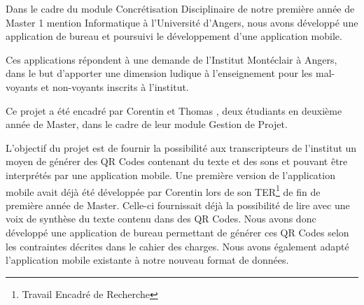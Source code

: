 
\par
Dans le cadre du module Concrétisation Disciplinaire de notre première année de Master 1 mention Informatique à l'Université d'Angers, nous avons développé une application de bureau et poursuivi le développement d'une application mobile.

\par
Ces applications répondent à une demande de l'Institut Montéclair à Angers, dans le but d'apporter une dimension ludique à l'enseignement pour les mal-voyants et non-voyants inscrits à l'institut.

\par
Ce projet a été encadré par Corentin  et Thomas , deux étudiants en deuxième année de Master, dans le cadre de leur module Gestion de Projet.\\

\par
L'objectif du projet est de fournir la possibilité aux transcripteurs de l'institut un moyen de générer des QR Codes contenant du texte et des sons et pouvant être interprétés par une application mobile. Une première version de l'application mobile avait déjà été développée par Corentin  lors de son TER\footnote{Travail Encadré de Recherche} de fin de première année de Master. Celle-ci fournissait déjà la possibilité de lire avec une voix de synthèse du texte contenu dans des QR Codes.
Nous avons donc développé une application de bureau permettant de générer ces QR Codes selon les contraintes décrites dans le cahier des charges. Nous avons également adapté l'application mobile existante à notre nouveau format de données.
